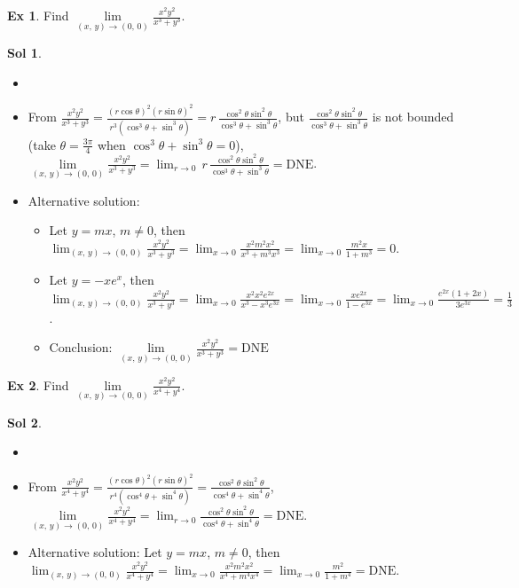 \documentclass[12pt]{extarticle}
\newcommand{\ds}{\displaystyle}
\theoremstyle{definition}
\newtheorem*{ex}{Ex}
\newtheorem*{sol}{Sol}
\begin{document}
\begin{ex}
  Find $\ds\lim\limits_{(x,\,y)\to (0,\,0)}\frac{x^2y^2}{x^3 + y^3}$. 
\end{ex}
\begin{sol}
  \begin{itemize}\setlength{\itemsep}{0pt}
    \item[]
    \item From $\ds\frac{x^2y^2}{x^3 + y^3} = \frac{(r\cos\theta)^2(r\sin\theta)^2}{r^3(\cos^3\theta + \sin^3\theta)} = r\,\frac{\cos^2\theta\sin^2\theta}{\cos^3\theta + \sin^3\theta}$, but $\ds\frac{\cos^2\theta\sin^2\theta}{\cos^3\theta + \sin^3\theta}$ is not bounded (take $\ds\theta = \frac{3\pi}{4}$ when $\cos^3\theta + \sin^3\theta = 0$), $\ds\lim\limits_{(x,\,y)\to (0,\,0)}\frac{x^2y^2}{x^3 + y^3} = \lim_{r\to 0}\,r\,\frac{\cos^2\theta\sin^2\theta}{\cos^3\theta + \sin^3\theta} = \text{DNE}$. 
    \item Alternative solution: 
      \begin{itemize}\setlength{\itemsep}{0pt}
        \item Let $y = mx$, $m\ne 0$, then $\ds\lim_{(x,\,y)\to (0,\,0)}\frac{x^2y^2}{x^3 + y^3} = \lim_{x\to 0}\frac{x^2m^2x^2}{x^3 + m^3 x^3} = \lim_{x\to 0}\frac{m^2x}{1 + m^3} = 0$. 
        \item Let $\ds y = -xe^x$, then $\ds\lim_{(x,\,y)\to (0,\,0)}\frac{x^2y^2}{x^3 + y^3} = \lim_{x\to 0}\frac{x^2x^2e^{2x}}{x^3 - x^3e^{3x}} = \lim_{x\to 0}\frac{xe^{2x}}{1 - e^{3x}} = \lim_{x\to 0}\frac{e^{2x}(1 + 2x)}{3e^{3x}} = \frac{1}{3}$. 
        \item Conclusion: $\ds\lim\limits_{(x,\,y)\to(0,\,0)}\frac{x^2y^2}{x^3 + y^3} = \text{DNE}$
      \end{itemize}
  \end{itemize}
\end{sol}

\begin{ex}
  Find $\ds\lim\limits_{(x,\,y)\to (0,\,0)}\frac{x^2y^2}{x^4 + y^4}$. 
\end{ex}
\begin{sol}
  \begin{itemize}\setlength{\itemsep}{0pt}
    \item[]
    \item From $\ds\frac{x^2y^2}{x^4 + y^4} = \frac{(r\cos\theta)^2(r\sin\theta)^2}{r^4(\cos^4\theta + \sin^4\theta)} = \frac{\cos^2\theta\sin^2\theta}{\cos^4\theta + \sin^4\theta}$, $\ds\lim\limits_{(x,\,y)\to (0,\,0)}\frac{x^2y^2}{x^4 + y^4} = \lim_{r\to 0}\frac{\cos^2\theta\sin^2\theta}{\cos^4\theta + \sin^4\theta} = \text{DNE}$. 
    \item Alternative solution: Let $y = mx$, $m\ne 0$, then $\ds\lim_{(x,\,y)\to (0,\,0)}\frac{x^2y^2}{x^4 + y^4} = \lim_{x\to 0}\frac{x^2m^2x^2}{x^4 + m^4 x^4} = \lim_{x\to 0}\frac{m^2}{1 + m^4} = \text{DNE}$. 
  \end{itemize}
\end{sol}
\end{document}
